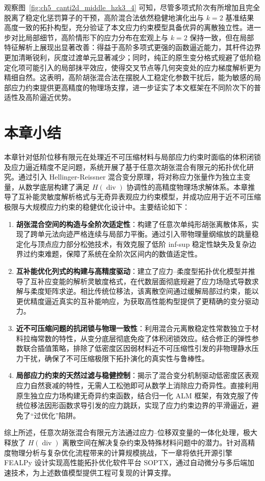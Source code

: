 观察图~\ref{fig:ch5_canti2d_middle_hzk3_4} 可知，尽管多项式阶次有所增加且完全脱离了稳定化惩罚算子的干预，高阶混合法依然稳健地演化出与 $k=2$ 基准结果高度一致的拓扑构型，充分验证了本文应力约束模型具备优异的离散独立性。进一步对比局部细节，高阶情形下的应力分布在宏观上与 $k=2$ 保持一致，但在局部特征解析上展现出显著改善：得益于高阶多项式更强的函数逼近能力，其杆件边界更加清晰锐利，灰度过渡单元显著减少；同时，纯正的原生变分格式规避了低阶稳定化项可能引入的局部抹平效应，使得交叉节点等几何突变处的应力梯度解析更为精细自然。这表明，高阶胡张混合法在摆脱人工稳定化参数干扰后，能为敏感的局部应力约束提供更高精度的物理场支撑，进一步证实了本文框架在不同阶次下的普适性及高阶逼近优势。


\section{本章小结}
\label{sec:hz_summary}

本章针对低阶位移有限元在处理近不可压缩材料与局部应力约束时面临的体积闭锁及应力逼近精度不足问题，系统开展了基于任意次胡张混合有限元的拓扑优化研究。通过引入 Hellinger-Reissner 混合变分原理，将对称应力张量作为独立主变量，从数学底层构建了满足 $H(\operatorname{div})$ 协调性的高精度物理场求解体系。本章推导了互补能灵敏度解析格式与无奇异表观应力约束模型，并成功应用于近不可压缩极限与大规模应力约束的稳健优化设计中。主要结论如下：

\begin{enumerate}
	\item \textbf{胡张混合空间的构造与全阶次适定性}：构建了任意次单纯形胡张离散体系，实现了跨单元法向迹严格连续与局部力平衡。通过引入带物理量纲缩放的跳量稳定化与顶点应力部分松弛技术，有效克服了低阶 inf-sup 稳定性缺失及复杂边界过约束难题，保障了系统在全阶次区间内的数值适定性。
	
	\item \textbf{互补能优化列式的构建与高精度驱动}：建立了应力--柔度型拓扑优化模型并推导了互补应变能的解析灵敏度格式，在代数层面彻底规避了应力场隐式导数求解与柔度矩阵求逆。相比传统位移法，该离散空间通过缓解局部过约束，能以更优精度逼近真实的互补能响应，为获取高性能构型提供了更精确的变分驱动力。
	
	\item \textbf{近不可压缩问题的抗闭锁与物理一致性}：利用混合元离散稳定性常数独立于材料拉梅常数的特性，从变分底层彻底免疫了体积闭锁效应。结合修正的弹性参数联合插值策略，排除了低密度区因弱材料近不可压缩性引发的非物理静水压力干扰，确保了不可压缩极限下拓扑演化的真实性与鲁棒性。
	
	\item \textbf{局部应力约束的天然过滤与稳健控制}：揭示了混合变分机制驱动低密度区表观应力自然衰减的特性，无需人工松弛即可从数学上消除应力奇异性。直接利用原生独立应力场构建无奇异约束函数，结合归一化 ALM 框架，有效克服了传统位移法因形函数求导引发的应力跳跃，实现了应力约束边界的平滑逼近，避免了“过优化”陷阱。
\end{enumerate}

综上所述，任意次胡张混合有限元方法通过应力--位移双变量的一体化处理，极大释放了 $H(\operatorname{div})$ 离散空间在解决复杂约束及特殊材料问题中的潜力。针对高精度物理分析与复杂优化流程带来的计算规模挑战，下一章将依托开源引擎 FEALPy 设计实现高性能拓扑优化软件平台 SOPTX，通过自动微分与多后端加速技术，为上述数值模型提供工程可复现的计算支撑。


\fi